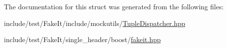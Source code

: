 The documentation for this struct was generated from the following files\+:\begin{DoxyCompactItemize}
\item 
include/test/\+Fake\+It/include/mockutils/\mbox{\hyperlink{TupleDispatcher_8hpp}{Tuple\+Dispatcher.\+hpp}}\item 
include/test/\+Fake\+It/single\+\_\+header/boost/\mbox{\hyperlink{single__header_2boost_2fakeit_8hpp}{fakeit.\+hpp}}\end{DoxyCompactItemize}
